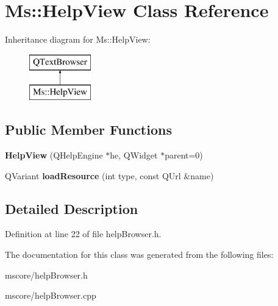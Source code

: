\hypertarget{class_ms_1_1_help_view}{}\section{Ms\+:\+:Help\+View Class Reference}
\label{class_ms_1_1_help_view}
Inheritance diagram for Ms\+:\+:Help\+View\+:\begin{figure}[H]
\begin{center}
\leavevmode
\includegraphics[height=2.000000cm]{class_ms_1_1_help_view}
\end{center}
\end{figure}
\subsection*{Public Member Functions}
\begin{DoxyCompactItemize}
\item 
\mbox{\label{class_ms_1_1_help_view_a40a696f405c1db777ab68c2ff0dab05d}} 
{\bfseries Help\+View} (Q\+Help\+Engine $\ast$he, Q\+Widget $\ast$parent=0)
\item 
\mbox{\label{class_ms_1_1_help_view_ad285a7a9800330c350b0ed8bcd9ad85f}} 
Q\+Variant {\bfseries load\+Resource} (int type, const Q\+Url \&name)
\end{DoxyCompactItemize}


\subsection{Detailed Description}


Definition at line 22 of file help\+Browser.\+h.



The documentation for this class was generated from the following files\+:\begin{DoxyCompactItemize}
\item 
mscore/help\+Browser.\+h\item 
mscore/help\+Browser.\+cpp\end{DoxyCompactItemize}
